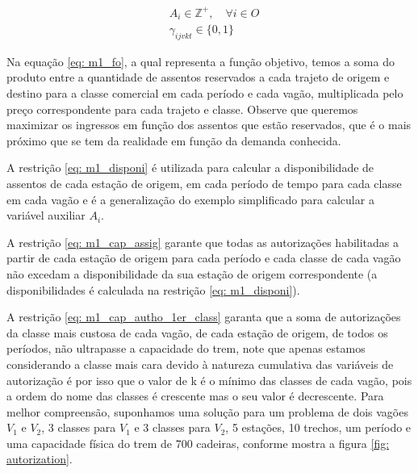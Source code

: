\begin{align}
	 & A_{i} \in \mathbb{Z}^+  , \quad \forall i \in O                                                                                                                                                                               \label{eq: m1_dom_disponi}                                                    \\
	 & \gamma_{ijvkt} \in \{0,1\}                                                                                                                                                                                        \label{eq: m1_dom_bin_nadja}
\end{align}


Na equação \ref{eq: m1_fo}, a qual representa a função objetivo, temos a soma do produto entre a quantidade de assentos reservados a cada trajeto de origem e destino para a classe comercial em cada período e cada vagão, multiplicada pelo preço correspondente para cada trajeto e classe. Observe que queremos maximizar os ingressos em função dos assentos que estão reservados, que é o mais próximo que se tem da realidade em função da demanda conhecida.

A restrição \ref{eq: m1_disponi} é utilizada para calcular a disponibilidade de assentos de cada estação de origem, em cada período de tempo para cada classe em cada vagão e é a generalização do exemplo simplificado para calcular a variável auxiliar $A_i$.

A restrição \ref{eq: m1_cap_assig} garante que todas as autorizações habilitadas a partir de cada estação de origem para cada período e cada classe de cada vagão não excedam a disponibilidade da sua estação de origem correspondente (a disponibilidades é calculada na restrição \ref{eq: m1_disponi}).


A restrição \ref{eq: m1_cap_autho_1er_class} garanta que a soma de autorizações da classe mais custosa de cada vagão, de cada estação de origem, de todos os períodos, não ultrapasse a capacidade do trem, note que apenas estamos considerando a classe mais cara devido à natureza cumulativa das variáveis de autorização é por isso que o valor de k é o mínimo das classes de cada vagão, pois a ordem do nome das classes é crescente mas o seu valor é decrescente. Para melhor compreensão, suponhamos uma solução para um problema de dois vagões $V_1$ e $V_2$, 3 classes para $V_1$ e 3 classes para $V_2$, 5 estações,  10 trechos, um período e uma capacidade física do trem de 700 cadeiras, conforme mostra a figura \ref{fig: autorization}.

